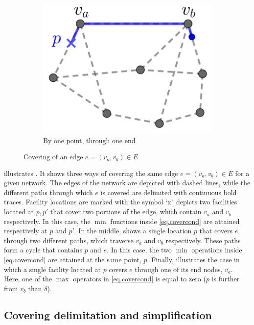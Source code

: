 \begin{figure}
\begin{subfigure}{0.33\textwidth}
   	\includegraphics[scale=1]{Chaptercflg/media/example-Theo2.png}
   	\caption{By one point, through one end}
   	\label{fig:teoex-c}
	\end{subfigure}
	\caption{Covering of an edge $e=(v_a,v_b)\in E$}
	\label{fig:teoex}
\end{figure}
 illustrates . It shows three ways of covering the same edge $e=(v_a,v_b)\in E$ for a given network. The edges of the network are depicted with dashed lines, while the different paths through which $e$ is covered are delimited with continuous bold traces. Facility locations are marked with the symbol `x'.  depicts two facilities located at $p,p'$ that cover two portions of the edge, which contain $v_a$ and $v_b$ respectively. In this case, the $\min$ functions inside \eqref{eq.covercond} are attained respectively at $p$ and $p'$. In the middle,   shows a single location $p$ that covers $e$ through two different paths, which traverse $v_a$ and $v_b$ respectively. These paths form a cycle that contains $p$ and $e$. In this case,  the two $\min$ operations inside \eqref{eq.covercond} are attained at the same point, $p$. Finally,  illustrates the case in which a single facility located at $p$ covers $e$ through one of its end nodes, $v_a$. Here, one of the $\max$ operators in \eqref{eq.covercond} is equal to zero ($p$ is further from $v_b$ than $\delta$).

\subsection{Covering delimitation and simplification}
\label{sec.subc}


